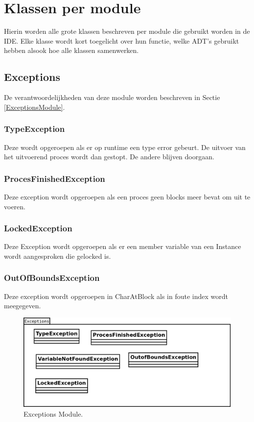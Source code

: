 \documentclass[]{article}
\begin{document}
\section{Klassen per module}
Hierin worden alle grote klassen beschreven per module die gebruikt worden in de IDE. Elke klasse wordt kort toegelicht over hun functie, welke ADT's gebruikt hebben alsook hoe alle klassen samenwerken.

\subsection{Exceptions}
De verantwoordelijkheden van deze module worden beschreven in Sectie \ref{ExceptionsModule}.
\subsubsection{TypeException}
Deze wordt opgeroepen als er op runtime een type error gebeurt. De uitvoer van het uitvoerend proces wordt dan gestopt. De andere blijven doorgaan.
\subsubsection{ProcesFinishedException}
Deze exception wordt opgeroepen als een proces geen blocks meer bevat om uit te voeren.
\subsubsection{LockedException}
Deze Exception wordt opgeroepen als er een member variable van een Instance wordt aangesproken die gelocked is.
\subsubsection{OutOfBoundsException}
Deze exception wordt opgeroepen in CharAtBlock als in foute index wordt meegegeven.

\clearpage
 \begin{figure}
  \centering
   
\includegraphics[scale=0.8]{./AnalyseClassenDiagram/exceptions.png}
  \caption{Exceptions Module.} \label{exceptionUML}
\end{figure}
\clearpage
\end{document}

